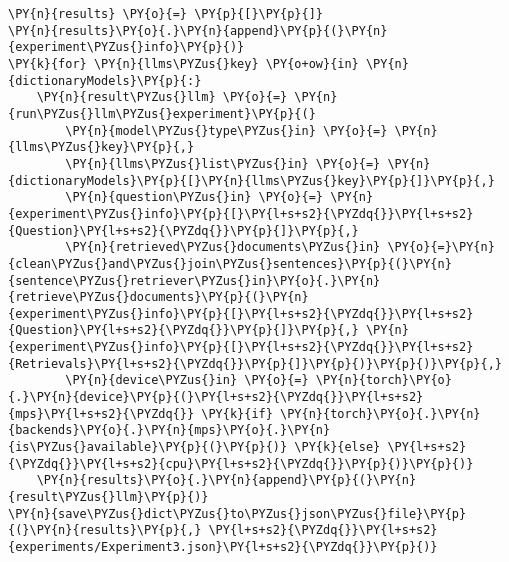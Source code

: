 \documentclass[11pt]{wseas}
\begin{document}
\begin{tcolorbox}[breakable, size=fbox, boxrule=1pt, pad at break*=1mm,colback=cellbackground, colframe=cellborder]
\begin{Verbatim}[commandchars=\\\{\}]
\PY{n}{results} \PY{o}{=} \PY{p}{[}\PY{p}{]}
\PY{n}{results}\PY{o}{.}\PY{n}{append}\PY{p}{(}\PY{n}{experiment\PYZus{}info}\PY{p}{)}
\PY{k}{for} \PY{n}{llms\PYZus{}key} \PY{o+ow}{in} \PY{n}{dictionaryModels}\PY{p}{:}
    \PY{n}{result\PYZus{}llm} \PY{o}{=} \PY{n}{run\PYZus{}llm\PYZus{}experiment}\PY{p}{(}
        \PY{n}{model\PYZus{}type\PYZus{}in} \PY{o}{=} \PY{n}{llms\PYZus{}key}\PY{p}{,}
        \PY{n}{llms\PYZus{}list\PYZus{}in} \PY{o}{=} \PY{n}{dictionaryModels}\PY{p}{[}\PY{n}{llms\PYZus{}key}\PY{p}{]}\PY{p}{,}
        \PY{n}{question\PYZus{}in} \PY{o}{=} \PY{n}{experiment\PYZus{}info}\PY{p}{[}\PY{l+s+s2}{\PYZdq{}}\PY{l+s+s2}{Question}\PY{l+s+s2}{\PYZdq{}}\PY{p}{]}\PY{p}{,}
        \PY{n}{retrieved\PYZus{}documents\PYZus{}in} \PY{o}{=}\PY{n}{clean\PYZus{}and\PYZus{}join\PYZus{}sentences}\PY{p}{(}\PY{n}{sentence\PYZus{}retriever\PYZus{}in}\PY{o}{.}\PY{n}{retrieve\PYZus{}documents}\PY{p}{(}\PY{n}{experiment\PYZus{}info}\PY{p}{[}\PY{l+s+s2}{\PYZdq{}}\PY{l+s+s2}{Question}\PY{l+s+s2}{\PYZdq{}}\PY{p}{]}\PY{p}{,} \PY{n}{experiment\PYZus{}info}\PY{p}{[}\PY{l+s+s2}{\PYZdq{}}\PY{l+s+s2}{Retrievals}\PY{l+s+s2}{\PYZdq{}}\PY{p}{]}\PY{p}{)}\PY{p}{)}\PY{p}{,}
        \PY{n}{device\PYZus{}in} \PY{o}{=} \PY{n}{torch}\PY{o}{.}\PY{n}{device}\PY{p}{(}\PY{l+s+s2}{\PYZdq{}}\PY{l+s+s2}{mps}\PY{l+s+s2}{\PYZdq{}} \PY{k}{if} \PY{n}{torch}\PY{o}{.}\PY{n}{backends}\PY{o}{.}\PY{n}{mps}\PY{o}{.}\PY{n}{is\PYZus{}available}\PY{p}{(}\PY{p}{)} \PY{k}{else} \PY{l+s+s2}{\PYZdq{}}\PY{l+s+s2}{cpu}\PY{l+s+s2}{\PYZdq{}}\PY{p}{)}\PY{p}{)}
    \PY{n}{results}\PY{o}{.}\PY{n}{append}\PY{p}{(}\PY{n}{result\PYZus{}llm}\PY{p}{)}
\PY{n}{save\PYZus{}dict\PYZus{}to\PYZus{}json\PYZus{}file}\PY{p}{(}\PY{n}{results}\PY{p}{,} \PY{l+s+s2}{\PYZdq{}}\PY{l+s+s2}{experiments/Experiment3.json}\PY{l+s+s2}{\PYZdq{}}\PY{p}{)}    
\end{Verbatim}
\end{tcolorbox}
\end{document}
